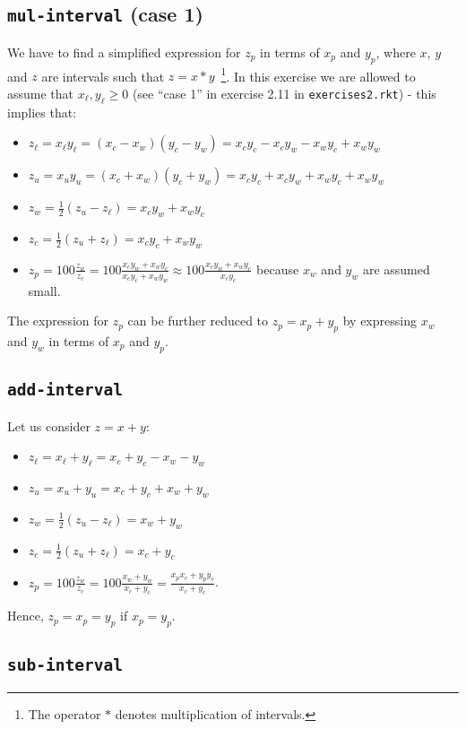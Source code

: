 \documentclass[12pt,a4paper]{article}
\newcommand\cc[1]{\texttt{#1}}
\begin{document}
\subsection{\cc{mul-interval} (case 1)}

We have to find a simplified expression for $z_p$ in terms of $x_p$ and $y_p$, where
$x$, $y$ and $z$ are intervals such that $z = x * y$~\footnote{The operator $*$ denotes
multiplication of intervals.}. In this exercise we are allowed to assume that $x_{\ell},
y_{\ell} \geq 0$ (see ``case 1'' in exercise 2.11 in \cc{exercises2.rkt}) - this implies
that:
\begin{itemize}
\item $z_{\ell} = x_{\ell} y_{\ell} = (x_c - x_w)(y_c - y_w) = x_cy_c - x_cy_w - x_wy_c + x_wy_w$
\item $z_{u} = x_{u} y_{u} = (x_c + x_w)(y_c + y_w) = x_cy_c + x_cy_w + x_wy_c + x_wy_w$
\item $z_w = \frac{1}{2}(z_u - z_{\ell}) = x_cy_w + x_wy_c$
\item $z_c = \frac{1}{2}(z_u + z_{\ell}) = x_cy_c + x_wy_w$
\item $z_p = 100\frac{z_w}{z_c} = 100\frac{x_cy_w + x_wy_c}{x_cy_c + x_wy_w} \approx 100\frac{x_cy_w + x_wy_c}{x_cy_c}$ because $x_w$ and $y_w$ are assumed small.
\end{itemize}
The expression for $z_p$ can be further reduced to $z_p = x_p + y_p$ by expressing $x_w$ and $y_w$ in terms of $x_p$ and $y_p$.

\subsection{\cc{add-interval}}

Let us consider $z = x + y$:
\begin{itemize}
\item $z_{\ell} = x_{\ell} + y_{\ell} = x_c + y_c - x_w - y_w$
\item $z_{u} = x_{u} + y_{u} = x_c + y_c + x_w + y_w$
\item $z_w = \frac{1}{2}(z_u - z_{\ell}) = x_w + y_w$
\item $z_c = \frac{1}{2}(z_u + z_{\ell}) = x_c + y_c$
\item $z_p = 100\frac{z_w}{z_c} = 100\frac{x_w + y_w}{x_c + y_c} = \frac{x_px_c + y_py_c}{x_c + y_c}$.
\end{itemize}
Hence, $z_p = x_p = y_p$ if $x_p = y_p$.

\subsection{\cc{sub-interval}}
\end{document}
